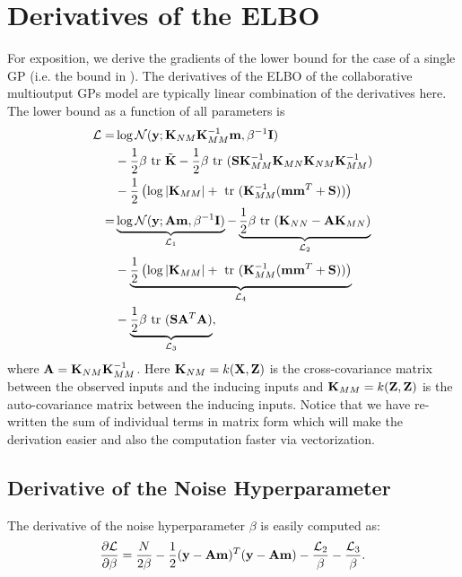 \documentclass[]{article}
\begin{document}
\section{Derivatives of the ELBO}
For exposition, we derive the gradients of the lower bound for the case of a single GP (i.e. the bound in \citet{hensmangaussian}).
The derivatives of the ELBO of the collaborative multioutput GPs model are typically linear combination of the derivatives here.
The lower bound as a function of all parameters is
\begin{align}
\nonumber
\mathcal{L}
=& \log \mathcal{N}(\mathbf{y}; \mathbf{K}_{NM} \mathbf{K}_{MM}^{-1} \mathbf{m}, \beta^{-1}\mathbf{I}) \\
\nonumber
 &- \frac{1}{2} \beta \mbox{ \rm tr } \tilde{\mathbf{K}}
 - \frac{1}{2} \beta \mbox{ \rm tr } (\mathbf{S}\mathbf{K}_{MM}^{-1} \mathbf{K}_{MN} \mathbf{K}_{NM} \mathbf{K}_{MM}^{-1}) \\  \nonumber
&- \frac{1}{2} \left( \log |\mathbf{K}_{MM}| + \mbox{ \rm tr }(\mathbf{K}_{MM}^{-1}(\mathbf{m} \mathbf{m}^T + \mathbf{S})) \right) \\ \nonumber
=& \underbrace{\log \mathcal{N}(\mathbf{y}; \mathbf{A} \mathbf{m}, \beta^{-1}\mathbf{I})}_{\mathcal{L}_1}
 - \underbrace{\frac{1}{2} \beta \mbox{ \rm tr } (\mathbf{K}_{NN} - \mathbf{A}\mathbf{K}_{MN})}_{\mathcal{L}_2} \\
 \nonumber
&- \underbrace{\frac{1}{2} \left( \log |\mathbf{K}_{MM}| + \mbox{ \rm tr }(\mathbf{K}_{MM}^{-1}(\mathbf{m} \mathbf{m}^T + \mathbf{S})) \right)}_{\mathcal{L}_4}\\
 & - \underbrace{\frac{1}{2} \beta \mbox{ \rm tr } (\mathbf{S}\mathbf{A}^T\mathbf{A})}_{\mathcal{L}_3},
\end{align}
where $\mathbf{A} = \mathbf{K}_{NM} \mathbf{K}_{MM}^{-1}$.
Here $\mathbf{K}_{NM} = k(\mathbf{X},\mathbf{Z})$ is the cross-covariance matrix between the observed inputs and the inducing inputs and $\mathbf{K}_{MM} = k(\mathbf{Z},\mathbf{Z})$ is the auto-covariance matrix between the inducing inputs.
Notice that we have re-written the sum of individual terms in matrix form which will make the derivation easier and also the computation faster via vectorization.

\subsection{Derivative of the Noise Hyperparameter}
The derivative of the noise hyperparameter $\beta$ is easily computed as:
\begin{align}
\frac{\partial{\mathcal{L}}}{\partial{\beta}} = \frac{N}{2\beta} - \frac{1}{2} (\mathbf{y} - \mathbf{A}\mathbf{m})^T (\mathbf{y} - \mathbf{A}\mathbf{m}) - \frac{\mathcal{L}_2}{\beta} - \frac{\mathcal{L}_3}{\beta}.
\end{align}
\end{document}
